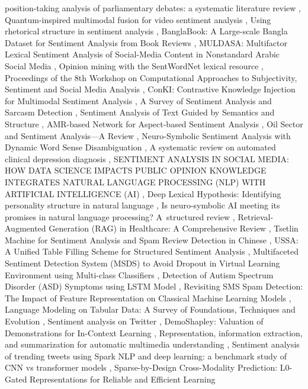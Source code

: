 \documentclass{article}
\begin{document}
position-taking analysis of parliamentary debates: a systematic literature review \cite{abercrombie2020sentimenta45f4c5f}, Quantum-inspired multimodal fusion for video sentiment analysis \cite{li2020quantuminspireddea5ae5a}, Using rhetorical structure in sentiment analysis \cite{hogenboom2015usingbcdd5ee6}, BanglaBook: A Large-scale Bangla Dataset for Sentiment Analysis from Book Reviews \cite{kabir2023banglabook8f8d1681}, MULDASA: Multifactor Lexical Sentiment Analysis of Social-Media Content in Nonstandard Arabic Social Media \cite{alwakid2022muldasa494768c0}, Opinion mining with the SentWordNet lexical resource \cite{ohana2009opinionb1086ed1}, Proceedings of the 8th Workshop on Computational Approaches to Subjectivity, Sentiment and Social Media Analysis \cite{joshi2017proceedingsb60a4ff4}, ConKI: Contrastive Knowledge Injection for Multimodal Sentiment Analysis \cite{yu2023conkif6d19a04}, A Survey of Sentiment Analysis and Sarcasm Detection \cite{yacoub2024surveyec309e9e}, Sentiment Analysis of Text Guided by Semantics and Structure \cite{hogenboom2009sentiment12bb51d1}, AMR-based Network for Aspect-based Sentiment Analysis \cite{ma2023amrbased5cc90650}, Oil Sector and Sentiment Analysis—A Review \cite{santos2023oilf649334f}, Neuro-Symbolic Sentiment Analysis with Dynamic Word Sense Disambiguation \cite{zhang2023neurosymbolic2490f8a5}, A systematic review on automated clinical depression diagnosis \cite{mao2023systematic791ed455}, SENTIMENT ANALYSIS IN SOCIAL MEDIA: HOW DATA SCIENCE IMPACTS PUBLIC OPINION KNOWLEDGE INTEGRATES NATURAL LANGUAGE PROCESSING (NLP) WITH ARTIFICIAL INTELLIGENCE (AI) \cite{alam2025sentiment284f7433}, Deep Lexical Hypothesis: Identifying personality structure in natural language \cite{cutler2022deep59d94f2d}, Is neuro-symbolic AI meeting its promises in natural language processing? A structured review \cite{hamilton2022neurosymbolicf89bd5ec}, Retrieval-Augmented Generation (RAG) in Healthcare: A Comprehensive Review \cite{neha2025retrievalaugmented537affb3}, Tsetlin Machine for Sentiment Analysis and Spam Review Detection in Chinese \cite{zhang2023tsetline116ff6e}, USSA: A Unified Table Filling Scheme for Structured Sentiment Analysis \cite{zhai2023ussa558da815}, Multifaceted Sentiment Detection System (MSDS) to Avoid Dropout in Virtual Learning Environment using Multi-class Classifiers \cite{t2023multifaceted30921198}, Detection of Autism Spectrum Disorder (ASD) Symptoms using LSTM Model \cite{mukherjee2024detection1f9cc3ec}, Revisiting SMS Spam Detection: The Impact of Feature Representation on Classical Machine Learning Models \cite{soysald2026revisiting0c8a8c5a}, Language Modeling on Tabular Data: A Survey of Foundations, Techniques and Evolution \cite{ruan2024languageed4af37b}, Sentiment analysis on Twitter \cite{proscia2017sentiment7ae0491a}, DemoShapley: Valuation of Demonstrations for In-Context Learning \cite{xie2024demoshapley0eb98bc5}, Representation, information extraction, and summarization for automatic multimedia understanding \cite{harrando2022representation75f8b324}, Sentiment analysis of trending tweets using Spark NLP and deep learning: a benchmark study of CNN vs transformer models \cite{benyamani2026sentiment9b767c99}, Sparse-by-Design Cross-Modality Prediction: L0-Gated Representations for Reliable and Efficient Learning 
\end{document}
